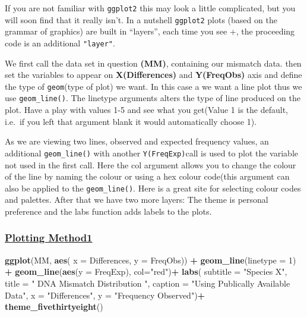 \documentclass[]{article}
\newenvironment{Shaded}{\begin{snugshade}}{\end{snugshade}}
\newcommand{\KeywordTok}[1]{\textcolor[rgb]{0.13,0.29,0.53}{\textbf{#1}}}
\newcommand{\DataTypeTok}[1]{\textcolor[rgb]{0.13,0.29,0.53}{#1}}
\newcommand{\DecValTok}[1]{\textcolor[rgb]{0.00,0.00,0.81}{#1}}
\newcommand{\StringTok}[1]{\textcolor[rgb]{0.31,0.60,0.02}{#1}}
\newcommand{\OperatorTok}[1]{\textcolor[rgb]{0.81,0.36,0.00}{\textbf{#1}}}
\newcommand{\NormalTok}[1]{#1}
\begin{document}
If you are not familiar with \texttt{ggplot2} this may look a little
complicated, but you will soon find that it really isn't. In a nutshell
\texttt{ggplot2} plots (based on the grammar of graphics) are built in
``layers'', each time you see +, the proceeding code is an additional
\texttt{"layer"}.

We first call the data set in question \textbf{(MM)}, containing our
mismatch data. then set the variables to appear on
\textbf{X(Differences)} and \textbf{Y(FreqObs)} axis and define the type
of \texttt{geom}(type of plot) we want. In this case a we want a line
plot thus we use \texttt{geom\_line()}. The linetype arguments alters
the type of line produced on the plot. Have a play with values 1-5 and
see what you get(Value 1 is the default, i.e.~if you left that argument
blank it would automatically choose 1).

As we are viewing two lines, observed and expected frequency values, an
additional \texttt{geom\_line()} with another \texttt{Y(FreqExp)}call is
used to plot the variable not used in the first call. Here the col
argument allows you to change the colour of the line by naming the
colour or using a hex colour code(this argument can also be applied to
the \texttt{geom\_line()}. Here is a great site for selecting colour
codes and palettes. After that we have two more layers: The theme is
personal preference and the labs function adds labels to the plots.

\subsubsection{\texorpdfstring{\href{sheading-2}{Plotting
Method1}}{Plotting Method1}}\label{plotting-method1}

\begin{Shaded}
\begin{Highlighting}[]
\KeywordTok{ggplot}\NormalTok{(MM, }\KeywordTok{aes}\NormalTok{(}
  \DataTypeTok{x =}\NormalTok{ Differences, }
  \DataTypeTok{y =}\NormalTok{ FreqObs)) }\OperatorTok{+}
\StringTok{  }\KeywordTok{geom_line}\NormalTok{(}\DataTypeTok{linetype =} \DecValTok{1}\NormalTok{) }\OperatorTok{+}
\StringTok{  }\KeywordTok{geom_line}\NormalTok{(}\KeywordTok{aes}\NormalTok{(}\DataTypeTok{y =}\NormalTok{ FreqExp), }\DataTypeTok{col=}\StringTok{"red"}\NormalTok{)}\OperatorTok{+}
\StringTok{  }\KeywordTok{labs}\NormalTok{(}
    \DataTypeTok{subtitle =} \StringTok{"Species X"}\NormalTok{,}
    \DataTypeTok{title =} \StringTok{" DNA Mismatch Distribution "}\NormalTok{,}
    \DataTypeTok{caption =} \StringTok{"Using Publically Available Data"}\NormalTok{,}
    \DataTypeTok{x =} \StringTok{"Differences"}\NormalTok{,}
    \DataTypeTok{y =} \StringTok{"Frequency Observed"}\NormalTok{)}\OperatorTok{+}
\StringTok{  }\KeywordTok{theme_fivethirtyeight}\NormalTok{() }
\end{Highlighting}
\end{Shaded}
\end{document}
